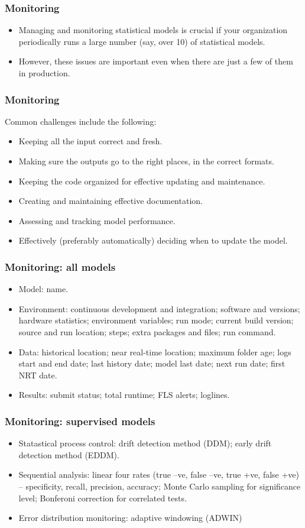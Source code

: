 \documentclass[11pt]{beamer}
\begin{document}
\begin{frame}
\frametitle{Monitoring}
\begin{itemize}
	\item Managing and monitoring statistical models is crucial if your organization periodically runs a large number (say, over 10) of statistical models. 
	\item However, these issues are important even when there are just a few of them in production. 
\end{itemize}
\end{frame}


\begin{frame}
\frametitle{Monitoring}
Common challenges include the following: 
\begin{itemize}
	\item Keeping all the input correct and fresh. 
	\item Making sure the outputs go to the right places, in the correct formats. 
	\item Keeping the code organized for effective updating and maintenance. 
	\item Creating and maintaining effective documentation. 
	\item Assessing and tracking model performance. 
	\item Effectively (preferably automatically) deciding when to update the model.
\end{itemize}
\end{frame}


\begin{frame}
\frametitle{Monitoring: all models}
\begin{itemize}
	\item Model: name.
	\item Environment: continuous development and integration; software and versions; hardware statistics; environment variables; run mode; current build version; source and run location; steps; extra packages and files; run command.
	\item Data: historical location; near real-time location; maximum folder age; logs start and end date; last history date; model last date; next run date; first NRT date.
	\item Results: submit status; total runtime; FLS alerts; loglines.
\end{itemize}
\end{frame}


\begin{frame}
\frametitle{Monitoring: supervised models}
\begin{itemize}
	\item Statastical process control: drift detection method (DDM); early drift detection method (EDDM).
	\item Sequential analysis: linear four rates (true –ve, false –ve, true +ve, false +ve) – specificity, recall, precision, accuracy; Monte Carlo sampling for significance level; Bonferoni correction for correlated tests.
	\item Error distribution monitoring: adaptive windowing (ADWIN)
\end{itemize}
\end{frame}
\end{document}
